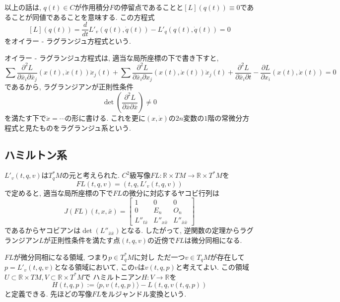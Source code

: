 \documentclass[a4paper]{ujarticle}
\numberwithin{equation}{section}
\theoremstyle{definition}
\begin{document}
        以上の話は, $q(t) \in C$が作用積分$F$の停留点であることと$[L](q(t)) \equiv 0$であることが同値であることを意味する.
        この方程式
        \[
            [L](q(t)) = \frac{d}{dt} L'_v(q(t), \dot{q}(t)) - L'_{q}(q(t), \dot{q}(t)) = 0
        \]
        をオイラー - ラグランジュ方程式という.

        オイラー - ラグランジュ方程式は, 適当な局所座標の下で書き下すと,
        \[
            \sum \frac{\partial^2 L}{\partial \bar{x}_i \partial \bar{x}_j}(x(t), \dot{x}(t)) \ddot{x}_j(t) + \sum \frac{\partial^2 L}{\partial \bar{x}_i \partial x_j}(x(t), \dot{x}(t)) \dot{x}_j(t) + \frac{\partial^2 L}{\partial \bar{x}_i \partial t} - \frac{\partial L}{\partial x_i}(x(t), \dot{x}(t)) = 0
        \]
        であるから, ラグランジアンが正則性条件
        \[
            \det(\frac{\partial^2 L}{\partial \bar{x} \partial \bar{x}}) \neq 0
        \]
        を満たす下で$\ddot{x} = \cdots$の形に書ける. これを更に$(x, \dot{x})$の$2n$変数の$1$階の常微分方程式と見たものをラグランジュ系という.

        \subsection{ハミルトン系}
        $L'_{v}(t, q, v)$は$T^{*}_q M$の元と考えられた. 
        $C^2$級写像$FL : \mathbb{R} \times TM \rightarrow \mathbb{R} \times T^{*} M$を
        \[
            FL(t, q, v) = (t, q, L'_{v}(t, q, v))
        \]
        で定めると, 適当な局所座標の下で$FL$の微分に対応するヤコビ行列は
        \[
            J(FL)(t, x, \bar{x})
            =
            \begin{bmatrix}
                1 & 0 & 0 \\
                0 & E_n & O_n \\
                L''_{t \bar{x}}& L''_{x \bar{x}} & L''_{\bar{x} \bar{x}}
            \end{bmatrix}
        \]
        であるからヤコビアンは$\det(L''_{\bar{x} \bar{x}})$となる.
        したがって, 逆関数の定理からラグランジアン$L$が正則性条件を満たす点$(t, q, v)$の近傍で$FL$は微分同相になる.
        
        $FL$が微分同相になる領域, つまり$p \in T^{*}_q M$に対し
        ただ一つ$v \in T_q M$が存在して$p = L'_v(t, q, v)$となる領域において, 
        この$v$は$v(t, q, p)$と考えてよい.
        この領域$U \subset \mathbb{R} \times TM, V \subset \mathbb{R} \times T^{*}M$で
        ハミルトニアン$H : V \rightarrow \mathbb{R}$を
        \[
            H(t, q, p) := \langle p, v(t, q, p)\rangle - L(t, q, v(t, q, p))
        \]
        と定義できる.
        先ほどの写像$FL$をルジャンドル変換という.
\end{document}
